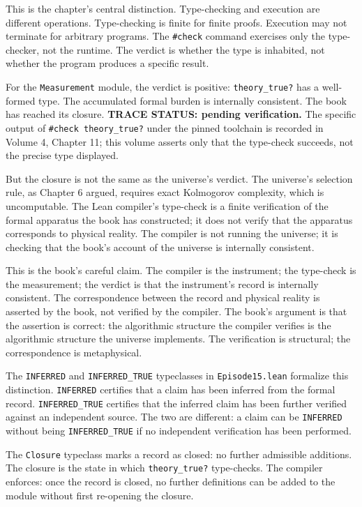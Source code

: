 This is the chapter's central distinction. Type-checking and
execution are different operations. Type-checking is finite for
finite proofs. Execution may not terminate for arbitrary
programs. The \texttt{\#check} command exercises only the type-
checker, not the runtime. The verdict is whether the type is
inhabited, not whether the program produces a specific result.

For the \texttt{Measurement} module, the verdict is positive:
\texttt{theory\_true?} has a well-formed type. The accumulated
formal burden is internally consistent. The book has reached
its closure. \textbf{TRACE STATUS: pending verification.} The
specific output of \texttt{\#check theory\_true?} under the
pinned toolchain is recorded in Volume 4, Chapter 11; this volume
asserts only that the type-check succeeds, not the precise type
displayed.

But the closure is not the same as the universe's verdict. The
universe's selection rule, as Chapter 6 argued, requires exact
Kolmogorov complexity, which is uncomputable. The Lean compiler's
type-check is a finite verification of the formal apparatus
the book has constructed; it does not verify that the apparatus
corresponds to physical reality. The compiler is not running the
universe; it is checking that the book's account of the universe
is internally consistent.

This is the book's careful claim. The compiler is the
instrument; the type-check is the measurement; the verdict is
that the instrument's record is internally consistent. The
correspondence between the record and physical reality is
asserted by the book, not verified by the compiler. The book's
argument is that the assertion is correct: the algorithmic
structure the compiler verifies is the algorithmic structure
the universe implements. The verification is structural; the
correspondence is metaphysical.

The \texttt{INFERRED} and \texttt{INFERRED\_TRUE} typeclasses
in \texttt{Episode15.lean} formalize this distinction.
\texttt{INFERRED} certifies that a claim has been inferred from
the formal record. \texttt{INFERRED\_TRUE} certifies that the
inferred claim has been further verified against an independent
source. The two are different: a claim can be \texttt{INFERRED}
without being \texttt{INFERRED\_TRUE} if no independent
verification has been performed.

The \texttt{Closure} typeclass marks a record as closed: no
further admissible additions. The closure is the state in which
\texttt{theory\_true?} type-checks. The compiler enforces:
once the record is closed, no further definitions can be added
to the module without first re-opening the closure.

